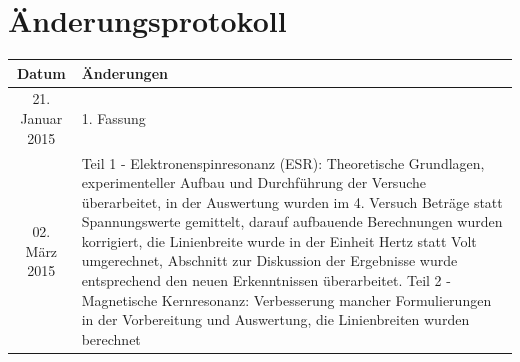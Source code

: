 \documentclass[a4paper,titlepage]{scrartcl}
\numberwithin{equation}{section}
\begin{document}
\section{Änderungsprotokoll}
\begin{table}[H]
\centering
\begin{tabularx}{\textwidth}{| c | X |}
\hline
\textbf{Datum} & \textbf{Änderungen}\\
\hline
21. Januar 2015 & 1. Fassung\\
\hline
02. März 2015 & Teil 1 - Elektronenspinresonanz (ESR): Theoretische Grundlagen, experimenteller Aufbau und Durchführung der Versuche überarbeitet, in der Auswertung wurden im 4. Versuch Beträge statt Spannungswerte gemittelt, darauf aufbauende Berechnungen wurden korrigiert, die Linienbreite wurde in der Einheit Hertz statt Volt umgerechnet, Abschnitt zur Diskussion der Ergebnisse wurde entsprechend den neuen Erkenntnissen überarbeitet. Teil 2 - Magnetische Kernresonanz: Verbesserung mancher Formulierungen in der Vorbereitung und Auswertung, die Linienbreiten wurden berechnet\\
\hline
\end{tabularx}
\end{table}


\end{document}
